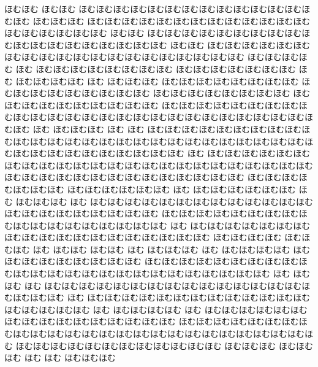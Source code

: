 \documentclass[a4paper]{article}
\begin{document}
\begin{prochomuhomu}{\NabeAzz}
ほむほむ ほむほむ ほむほむほむほむほむほむほむほむほむほむほむほむほむほむほむ ほむほむほむ ほむほむほむほむほむほむほむほむほむほむほむほむほむほむほむほむほむほむほむ ほむほむ ほむほむほむほむほむほむほむほむほむほむほむほむほむほむほむほむほむほむほむ ほむほむ ほむほむほむほむほむほむほむほむほむほむほむほむほむほむほむほむほむほむほむほむ ほむほむほむほむ ほむ ほむほむほむほむほむほむほむほむ ほむほむほむほむほむほむほむ ほむ ほむほむほむほむ ほむ ほむほむほむ ほむほむほむほむほむほむほむほむ ほむほむほむほむほむほむほむほむほむ ほむほむほむほむほむほむほむほむ ほむほむほむほむほむほむほむほむほむほむ ほむほむほむほむほむほむほむほむほむほむほむほむほむほむほむほむほむほむほむほむほむほむほむほむほむほむほむほむ ほむ ほむほむほむ ほむ ほむ ほむほむほむほむほむほむほむほむほむほむほむほむほむほむほむほむほむほむほむほむほむほむほむほむほむほむほむほむほむほむほむほむほむほむほむほむほむほむ ほむ ほむほむほむほむほむほむほむほむほむほむほむほむほむほむほむほむほむほむほむほむほむほむほむほむほむほむほむほむほむほむほむほむほむほむほむほむほむほむ ほむほむほむほむほむほむほむ ほむほむほむほむほむほむ ほむ ほむほむほむほむほむほむ ほむ ほむほむほむ
ほむ ほむほむほむほむほむほむほむほむほむほむほむほむほむほむほむほむほむほむほむほむほむほむ ほむほむほむほむほむほむほむほむほむほむほむほむほむほむほむほむほむほむ ほむ ほむほむほむほむほむほむほむほむほむほむほむほむほむほむほむほむほむほむほむ ほむほむほむほむ ほむほむほむ ほむ ほむほむ ほむほむ ほむ ほむほむほむ ほむ ほむほむほむほむ ほむ ほむほむほむほむほむほむほむほむ ほむほむほむほむほむほむほむほむほむほむほむほむほむほむほむほむほむほむほむほむほむほむほむほむほむ ほむ ほむほむ
ほむ ほむほむほむほむほむほむほむほむほむほむほむほむほむほむほむほむほむほむほむ ほむ ほむほむほむほむほむほむほむほむほむほむほむほむほむほむほむほむほむほむ ほむ ほむほむほむほむ ほむ ほむほむほむほむほむほむほむほむほむほむほむほむほむほむほむほむ ほむほむほむほむほむほむほむほむほむほむほむほむほむほむほむほむほむほむほむほむほむほむほむほむほむほむ ほむほむほむほむほむほむほむほむほむほむほむほむ ほむほむほむ ほむほむほむ ほむ ほむ ほむほむほむ
\end{prochomuhomu}

\newcommand*{\AhoFont}{\usefont{OT1}{cmfr}{m}{it}\LARGE}
\end{document}

